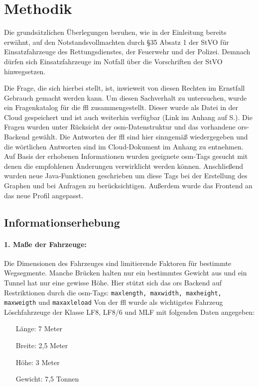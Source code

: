 \section{Methodik}
Die grundsätzlichen Überlegungen beruhen, wie in der Einleitung bereits erwähnt, auf den Notstandsvollmachten durch §35 Absatz 1 der StVO für Einsatzfahrzeuge des Rettungsdienstes, der Feuerwehr und der Polizei.
Demnach dürfen sich Einsatzfahrzeuge im Notfall über die Vorschriften der StVO hinwegsetzen.

Die Frage, die sich hierbei stellt, ist, inwieweit von diesen Rechten im Ernstfall Gebrauch gemacht werden kann.
Um diesen Sachverhalt zu untersuchen, wurde ein Fragenkatalog für die \gls{ffl} zusammengestellt.
Dieser wurde als Datei in der Cloud gespeichert und ist auch weiterhin verfügbar (Link im Anhang auf S.\pageref{sec:anhang}).
Die Fragen wurden unter Rücksicht der \gls{osm}-Datenstruktur und das vorhandene \gls{ors}-Backend gewählt.
Die Antworten der \gls{ffl} sind hier sinngemäß wiedergegeben und die wörtlichen Antworten sind im Cloud-Dokument im Anhang zu entnehmen.
Auf Basis der erhobenen Informationen wurden geeignete \gls{osm}-Tags gesucht mit denen die empfohlenen Änderungen verwirklicht werden können.
Anschließend wurden neue Java-Funktionen geschrieben um diese Tags bei der Erstellung des Graphen und bei Anfragen zu berücksichtigen.
Außerdem wurde das Frontend an das neue Profil angepasst.

\subsection{Informationserhebung}

\paragraph*{1. Maße der Fahrzeuge:}
\label{frage1}
\par
Die Dimensionen des Fahrzeuges sind limitierende Faktoren für bestimmte Wegsegmente.
Manche Brücken halten nur ein bestimmtes Gewicht aus und ein Tunnel hat nur eine gewisse Höhe.
Hier stützt sich das \gls{ors} Backend auf Restriktionen durch die \gls{osm}-Tags: \texttt{maxlength, maxwidth, maxheight, maxweigth} und \texttt{maxaxleload} Von der \gls{ffl} wurde als wichtigstes Fahrzeug Löschfahrzeuge der Klasse LF8, LF8/6 und MLF mit folgenden Daten angegeben:
\begin{itemize}
\centering
\item[Länge:] 7 Meter
\item[Breite:] 2,5 Meter
\item[Höhe:] 3 Meter
\item[Gewicht:] 7,5 Tonnen
\end{itemize}

